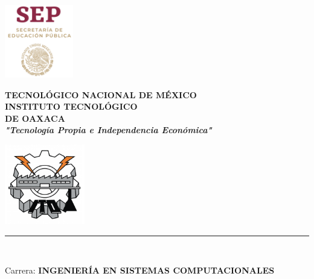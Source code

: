 \begin{titlepage}
    \begin{center}
        \begin{minipage}{2.5cm}
            \begin{center}
                \includegraphics[width=3.0cm]{images/logo-sep.png}
            \end{center}
        \end{minipage}\hfill
        \begin{minipage}{10cm}
            \begin{center}
                {\large \textbf{TECNOLÓGICO NACIONAL DE MÉXICO}}\\[0.2cm]
                {\LARGE \textbf{INSTITUTO TECNOLÓGICO}\\[0.1cm] \textbf{DE OAXACA}}\\[0.2cm]
                {\normalsize \textbf{\textit{"Tecnología Propia e Independencia Económica"}}}
            \end{center}
        \end{minipage}\hfill
        \begin{minipage}{2.5cm}
            \begin{center}
                \includegraphics[width=3.5cm]{images/logo-ito}
            \end{center}
        \end{minipage}

        \rule[1cm]{\textwidth}{3pt}

        \vspace{-0.5cm}
        \LARGE
        \underline{\textbf{\myAsignature}} \\[0.1cm]
        \small
        \myClave

        \vspace{0.8cm}
        \large
        Carrera: \textbf{INGENIERÍA EN SISTEMAS COMPUTACIONALES}
        

\end{center}
\end{titlepage}

